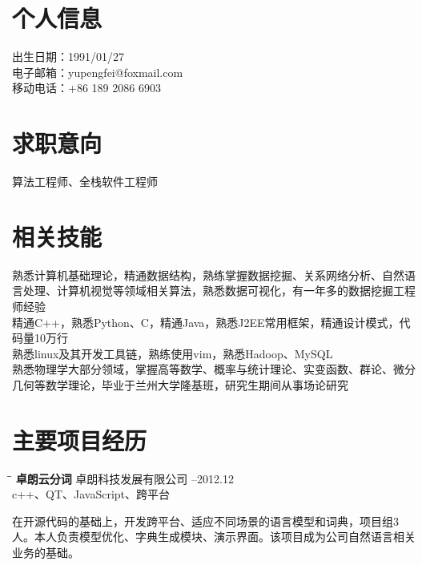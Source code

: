 \documentclass{res}
\begin{document}
 
\begin{CJK}{UTF8}{gbsn}

                                  
\begin{resume}

\section{个人信息} 
出生日期：1991/01/27\\
电子邮箱：yupengfei@foxmail.com\\
移动电话：+86 189 2086 6903
\section{求职意向}          
    算法工程师、全栈软件工程师 
 
\section{相关技能}        
	熟悉计算机基础理论，精通数据结构，熟练掌握数据挖掘、关系网络分析、自然语言处理、计算机视觉等领域相关算法，熟悉数据可视化，有一年多的数据挖掘工程师经验\\
    精通C++，熟悉Python、C，精通Java，熟悉J2EE常用框架，精通设计模式，代码量10万行\\
    熟悉linux及其开发工具链，熟练使用vim，熟悉Hadoop、MySQL\\  
    熟悉物理学大部分领域，掌握高等数学、概率与统计理论、实变函数、群论、微分几何等数学理论，毕业于兰州大学隆基班，研究生期间从事场论研究
             

\section{主要项目经历}
 \vspace{-0.1in}	
   \begin{tabbing}
   \hspace{2.3in}\= \hspace{2.6in}\= \kill %
    {\bf 卓朗云分词} \>卓朗科技发展有限公司     --2012.12\\
                             \>c++、QT、JavaScript、跨平台
   \end{tabbing}\vspace{-20pt}      %
   在开源代码的基础上，开发跨平台、适应不同场景的语言模型和词典，项目组3人。本人负责模型优化、字典生成模块、演示界面。该项目成为公司自然语言相关业务的基础。
   

\end{resume}
\end{CJK}
\end{document}
